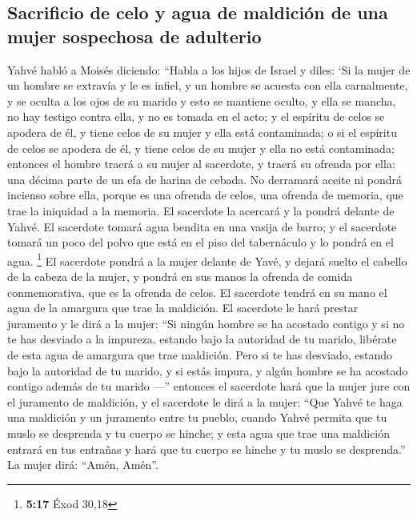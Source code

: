 \hypertarget{sacrificio-de-celo-y-agua-de-maldiciuxf3n-de-una-mujer-sospechosa-de-adulterio}{%
\subsection{Sacrificio de celo y agua de maldición de una mujer
sospechosa de
adulterio}\label{sacrificio-de-celo-y-agua-de-maldiciuxf3n-de-una-mujer-sospechosa-de-adulterio}}

 Yahvé habló a Moisés diciendo:  ``Habla a
los hijos de Israel y diles: `Si la mujer de un hombre se extravía y le
es infiel,  y un hombre se acuesta con ella carnalmente,
y se oculta a los ojos de su marido y esto se mantiene oculto, y ella se
mancha, no hay testigo contra ella, y no es tomada en el acto;
 y el espíritu de celos se apodera de él, y tiene celos
de su mujer y ella está contaminada; o si el espíritu de celos se
apodera de él, y tiene celos de su mujer y ella no está contaminada;
 entonces el hombre traerá a su mujer al sacerdote, y
traerá su ofrenda por ella: una décima parte de un efa de harina de
cebada. No derramará aceite ni pondrá incienso sobre ella, porque es una
ofrenda de celos, una ofrenda de memoria, que trae la iniquidad a la
memoria.  El sacerdote la acercará y la pondrá delante de
Yahvé.  El sacerdote tomará agua bendita en una vasija de
barro; y el sacerdote tomará un poco del polvo que está en el piso del
tabernáculo y lo pondrá en el agua. \footnote{\textbf{5:17} Éxod 30,18}
 El sacerdote pondrá a la mujer delante de Yavé, y dejará
suelto el cabello de la cabeza de la mujer, y pondrá en sus manos la
ofrenda de comida conmemorativa, que es la ofrenda de celos. El
sacerdote tendrá en su mano el agua de la amargura que trae la
maldición.  El sacerdote le hará prestar juramento y le
dirá a la mujer: ``Si ningún hombre se ha acostado contigo y si no te
has desviado a la impureza, estando bajo la autoridad de tu marido,
libérate de esta agua de amargura que trae maldición. 
Pero si te has desviado, estando bajo la autoridad de tu marido, y si
estás impura, y algún hombre se ha acostado contigo además de tu marido
---''  entonces el sacerdote hará que la mujer jure con
el juramento de maldición, y el sacerdote le dirá a la mujer: ``Que
Yahvé te haga una maldición y un juramento entre tu pueblo, cuando Yahvé
permita que tu muslo se desprenda y tu cuerpo se hinche; 
y esta agua que trae una maldición entrará en tus entrañas y hará que tu
cuerpo se hinche y tu muslo se desprenda.'' La mujer dirá: ``Amén,
Amén''.

